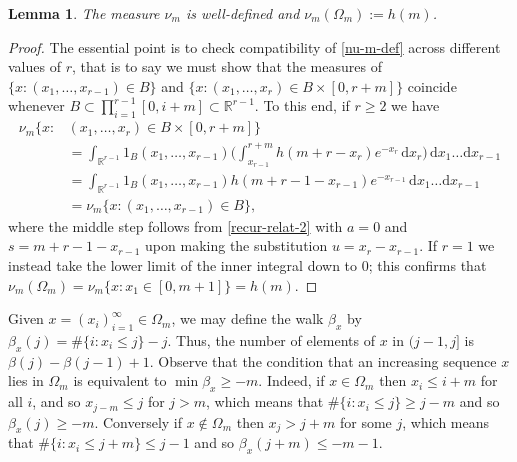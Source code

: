 \documentclass[11pt,reqno]{amsart}
\numberwithin{equation}{section}
\newtheorem{lemma}[theorem]{Lemma}
\theoremstyle{definition}
\theoremstyle{remark}
\renewcommand{\le}{\leqslant}
\renewcommand{\ge}{\geqslant}
\newcommand\R{\mathbb{R}}
\begin{document}
\begin{lemma}
The measure $\nu_m$ is well-defined and $\nu_m (\Omega_{m}) := h(m)$.
\end{lemma}
\begin{proof} The essential point is to check compatibility of \cref{nu-m-def} across different values of $r$, that is to say we must show that the measures of $\{ x : (x_1,\dots, x_{r-1}) \in B\}$ and $\{ x : (x_1,\dots, x_{r}) \in B \times [0,r + m]\}$ coincide whenever $B \subset \prod_{i = 1}^{r-1} [0, i + m] \subset \R^{r - 1}$. To this end, if $r \ge 2$ we have
\begin{align*}
\nu_m  \{ x : & (x_1,\dots, x_{r}) \in B \times [0, r + m]\} \\ & = \int_{\R^{r-1}} 1_{B}(x_1,\dots, x_{r-1})\big( \int_{x_{r-1}}^{r + m} h(m+r - x_r) e^{-x_r} \, \mathrm{d}x_r \big) \, \mathrm{d}x_1 \dots\mathrm{d}x_{r-1} \\ & = \int_{\R^{r-1}} 1_{B}(x_1 ,\dots, x_{r-1}) h(m + r - 1 - x_{r-1}) e^{-x_{r-1}}\,\mathrm{d}x_1 \dots \mathrm{d}x_{r-1} \\ & = \nu_m \{ x : (x_1,\dots, x_{r-1}) \in B\}, \end{align*} where the middle step follows from \cref{recur-relat-2} with $a = 0$ and $s = m + r - 1 - x_{r-1}$ upon making the substitution $u = x_r - x_{r - 1}$. If $r = 1$ we instead take the lower limit of the inner integral down to $0$; this confirms that $\nu_m(\Omega_m) = \nu_m \{ x : x_1 \in [0, m + 1]\} = h(m)$.
\end{proof}

Given $x = (x_i)_{i = 1}^{\infty} \in \Omega_m$, we may define the walk $\beta_{x}$ by $\beta_{x}(j) = \# \{ i : x_i \le  j\} - j$. Thus, the number of elements of $x$ in $(j - 1, j]$ is $\beta(j) - \beta(j-1) + 1$. Observe that the condition that an increasing sequence $x$ lies in $\Omega_m$ is equivalent to $\min \beta_{x} \ge -m$. Indeed, if $x \in \Omega_m$ then $x_i \le i + m$ for all $i$, and so $x_{j-m} \le j$ for $j > m$, which means that $\# \{ i : x_i \le j\} \ge j - m$ and so $\beta_{x}(j) \ge -m$. Conversely if $x \notin \Omega_m$ then $x_j > j + m$ for some $j$, which means that $\# \{ i : x_i \le j + m\} \le j - 1$ and so $\beta_x(j+m) \le -m - 1$.
\end{document}
